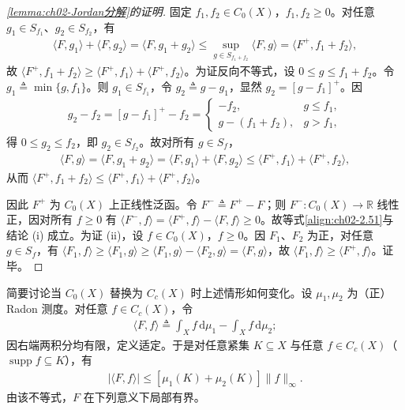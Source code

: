 \documentclass[../../main.tex]{subfiles}%
\begin{document}
\begin{proof}[\cref{lemma:ch02-Jordan分解}的证明]
固定 $f_1,f_2\in C_0(X)$，$f_1,f_2\geqslant0$。对任意 $g_1\in S_{f_1}$、$g_2\in S_{f_2}$，有
\begin{align*}
\langle F,g_1\rangle+\langle F,g_2\rangle=\langle F,g_1+g_2\rangle
\leqslant\sup_{g\in S_{f_1+f_2}}\langle F,g\rangle=\langle F^+,f_1+f_2\rangle,
\end{align*}
故 $\langle F^+,f_1+f_2\rangle\geqslant\langle F^+,f_1\rangle+\langle F^+,f_2\rangle$。为证反向不等式，设 $0\leqslant g\leqslant f_1+f_2$。令 $g_1\triangleq \min\{g,f_1\}$。则 $g_1\in S_{f_1}$，令 $g_2\triangleq g-g_1$，显然 $g_2=[g-f_1]^+$。因
\begin{align*}
g_2-f_2=[g-f_1]^+-f_2=
\begin{cases}
-f_2, & g\leqslant f_1,\\
g-(f_1+f_2), & g>f_1,
\end{cases}
\end{align*}
得 $0\leqslant g_2\leqslant f_2$，即 $g_2\in S_{f_2}$。故对所有 $g\in S_f$，
\begin{align*}
\langle F,g\rangle=\langle F,g_1+g_2\rangle=\langle F,g_1\rangle+\langle F,g_2\rangle
\leqslant\langle F^+,f_1\rangle+\langle F^+,f_2\rangle,
\end{align*}
从而 $\langle F^+,f_1+f_2\rangle\leqslant\langle F^+,f_1\rangle+\langle F^+,f_2\rangle$。

因此 $F^+$ 为 $C_0(X)$ 上正线性泛函。令 $F^-\triangleq F^+-F$；则 $F^-:C_0(X)\to\mathbb R$ 线性正，因对所有 $f\geqslant0$ 有 $\langle F^-,f\rangle=\langle F^+,f\rangle-\langle F,f\rangle\geqslant0$。故等式\eqref{align:ch02-2.51}与结论 (i) 成立。为证 (ii)，设 $f\in C_0(X)$，$f\geqslant0$。因 $F_1$、$F_2$ 为正，对任意 $g\in S_f$，有 $\langle F_1,f\rangle\geqslant\langle F_1,g\rangle\geqslant\langle F_1,g\rangle-\langle F_2,g\rangle=\langle F,g\rangle$，故 $\langle F_1,f\rangle\geqslant\langle F^+,f\rangle$。证毕。
\end{proof}

简要讨论当 $C_0(X)$ 替换为 $C_c(X)$ 时上述情形如何变化。设 $\mu_1,\mu_2$ 为（正）Radon 测度。对任意 $f\in C_c(X)$，令
\begin{align}
\langle F,f\rangle\triangleq \int_X f\,\mathrm{d}\mu_1-\int_X f\,\mathrm{d}\mu_2; \label{align:ch02-2.54}
\end{align}
因右端两积分均有限，定义适定。于是对任意紧集 $K\subseteq X$ 与任意 $f\in C_c(X)$（$\operatorname{supp}f\subseteq K$），有
\begin{align*}
|\langle F,f\rangle|\leqslant[\mu_1(K)+\mu_2(K)]\|f\|_\infty.
\end{align*}
由该不等式，$F$ 在下列意义下局部有界。
\end{document}

